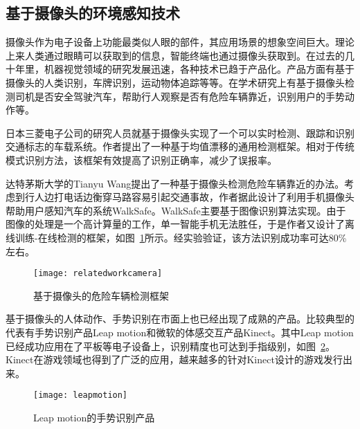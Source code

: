 \subsection{基于摄像头的环境感知技术}


摄像头作为电子设备上功能最类似人眼的部件，其应用场景的想象空间巨大。理论上来人类通过眼睛可以获取到的信息，智能终端也通过摄像头获取到。在过去的几十年里，机器视觉领域的研究发展迅速，各种技术已趋于产品化。产品方面有基于摄像头的人类识别，车牌识别，运动物体追踪等等。在学术研究上有基于摄像头检测司机是否安全驾驶汽车，帮助行人观察是否有危险车辆靠近，识别用户的手势动作等。

日本三菱电子公司的研究人员就基于摄像头实现了一个可以实时检测、跟踪和识别交通标志的车载系统。作者提出了一种基于均值漂移的通用检测框架。相对于传统模式识别方法，该框架有效提高了识别正确率，减少了误报率。 

达特茅斯大学的Tianyu Wang提出了一种基于摄像头检测危险车辆靠近的办法。考虑到行人边打电话边衡穿马路容易引起交通事故，作者据此设计了利用手机摄像头帮助用户感知汽车的系统WalkSafe。WalkSafe主要基于图像识别算法实现。由于图像的处理是一个高计算量的工作，单一智能手机无法胜任，于是作者又设计了离线训练-在线检测的框架，如图~\ref{fig:relatedworkcamera}所示。经实验验证，该方法识别成功率可达80\%左右。
\begin{figure}[htbp] %
  \centering
  \texttt{[image: relatedworkcamera]}
  \caption{基于摄像头的危险车辆检测框架}
  \label{fig:relatedworkcamera}
\end{figure}

基于摄像头的人体动作、手势识别在市面上也已经出现了成熟的产品。比较典型的代表有手势识别产品Leap motion和微软的体感交互产品Kinect。其中Leap motion已经成功应用在了平板等电子设备上，识别精度也可达到手指级别，如图~\ref{fig:leapmotion}。Kinect在游戏领域也得到了广泛的应用，越来越多的针对Kinect设计的游戏发行出来。

\begin{figure}[htbp] %
  \centering
  \texttt{[image: leapmotion]}
  \caption{Leap motion的手势识别产品}
  \label{fig:leapmotion}
\end{figure}


